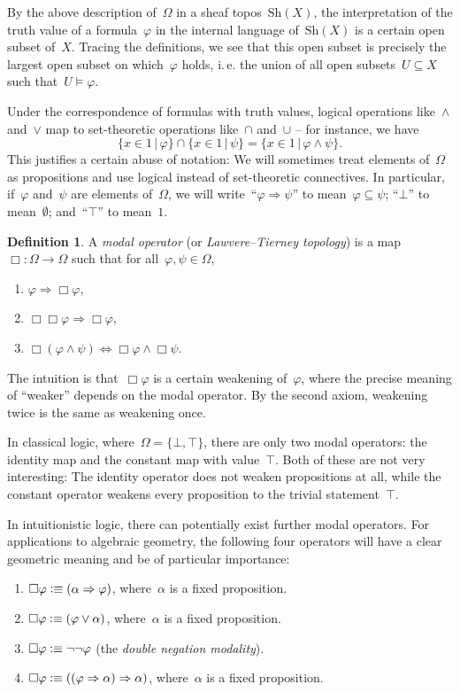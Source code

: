 \documentclass[10pt]{amsart}
\makeatletter
\theoremstyle{definition}
\newtheorem{defn}{Definition}[section]
\theoremstyle{plain}
\theoremstyle{remark}
\newcommand{\Sh}{\mathrm{Sh}}
\newcommand{\?}{\,{:}\,}
\renewcommand{\_}{\mathpunct{.}\,}
\newcommand{\ie}{i.\,e.\@\xspace}
\newcommand{\defequiv}{\vcentcolon\equiv}
\makeatother
\begin{document}
By the above description of~$\Omega$ in
a sheaf topos~$\Sh(X)$, the interpretation of the truth value
of a formula~$\varphi$ in the internal language of~$\Sh(X)$ is a certain open
subset of~$X$. Tracing the definitions, we see that this open subset is
precisely the largest open subset on which~$\varphi$ holds, \ie the union of
all open subsets~$U \subseteq X$ such that~$U \models \varphi$.

Under the correspondence of formulas with truth values, logical operations
like~$\wedge$ and~$\vee$ map to set-theoretic operations like~$\cap$ and~$\cup$
-- for instance, we have
\[ \{ x \in 1 \,|\, \varphi \} \cap \{ x \in 1 \,|\, \psi \} =
  \{ x \in 1 \,|\, \varphi \wedge \psi \}. \]
This justifies a certain abuse of notation: We will sometimes treat elements
of~$\Omega$ as propositions and use logical instead of set-theoretic
connectives. In particular, if~$\varphi$ and~$\psi$ are elements of~$\Omega$,
we will write~``$\varphi \Rightarrow \psi$'' to mean~$\varphi \subseteq \psi$;
``$\bot$'' to mean~$\emptyset$; and~``$\top$'' to mean~$1$.

\begin{defn}A \emph{modal operator} (or \emph{Lawvere--Tierney topology}) is a map~$\Box : \Omega \to \Omega$ such
that for all~$\varphi, \psi \in \Omega$,
\begin{enumerate}
\item $\varphi \Longrightarrow \Box\varphi$,
\item $\Box\Box\varphi \Longrightarrow \Box\varphi$,
\item $\Box(\varphi \wedge \psi) \Longleftrightarrow \Box\varphi \wedge \Box\psi$.
\end{enumerate}
\end{defn}

The intuition is that~$\Box\varphi$ is a certain weakening of~$\varphi$, where
the precise meaning of ``weaker'' depends on the modal operator. By the second
axiom, weakening twice is the same as weakening once.

In classical logic, where~$\Omega = \{ \bot, \top \}$, there are only two modal
operators: the identity map and the constant map with value~$\top$.
Both of these are not very interesting: The identity operator does not weaken
propositions at all, while the constant operator weakens every proposition to
the trivial statement~$\top$.

In intuitionistic logic, there can potentially exist further modal operators.
For applications to algebraic geometry, the following four operators will have
a clear geometric meaning and be of particular importance:
\begin{enumerate}
\item $\Box\varphi \defequiv (\alpha \Rightarrow \varphi)$, where~$\alpha$ is a
fixed proposition.
\item $\Box\varphi \defequiv (\varphi \vee \alpha)$, where~$\alpha$ is a
fixed proposition.
\item $\Box\varphi \defequiv \neg\neg\varphi$ (the \emph{double negation
modality}).
\item $\Box\varphi \defequiv ((\varphi \Rightarrow \alpha) \Rightarrow \alpha)$,
where~$\alpha$ is a fixed proposition.
\end{enumerate}
\end{document}

